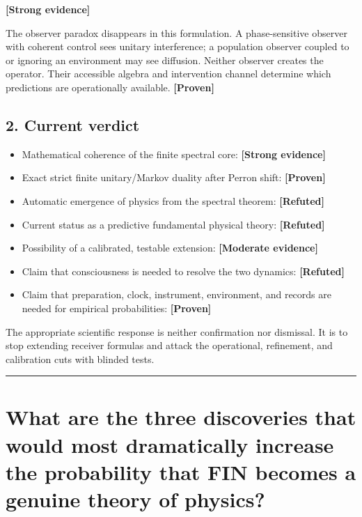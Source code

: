 \documentclass[11pt,a4paper,openany]{report}
\newcommand{\statusProven}{\textcolor{fingreen}{[Proven]}}
\newcommand{\statusStrong}{\textcolor{finblue}{[Strong evidence]}}
\newcommand{\statusModerate}{\textcolor{finviolet}{[Moderate evidence]}}
\newcommand{\statusRefuted}{\textcolor{finred}{[Refuted]}}
\begin{document}
\textbf{\statusStrong{}}

The observer paradox disappears in this formulation. A phase-sensitive observer with coherent control sees unitary interference; a population observer coupled to or ignoring an environment may see diffusion. Neither observer creates the operator. Their accessible algebra and intervention channel determine which predictions are operationally available. \textbf{\statusProven{}}

\section{2. Current verdict}

\begin{itemize}
\item 
Mathematical coherence of the finite spectral core: \textbf{\statusStrong{}}

\item 
Exact strict finite unitary/\allowbreak{}Markov duality after Perron shift: \textbf{\statusProven{}}

\item 
Automatic emergence of physics from the spectral theorem: \textbf{\statusRefuted{}}

\item 
Current status as a predictive fundamental physical theory: \textbf{\statusRefuted{}}

\item 
Possibility of a calibrated, testable extension: \textbf{\statusModerate{}}

\item 
Claim that consciousness is needed to resolve the two dynamics: \textbf{\statusRefuted{}}

\item 
Claim that preparation, clock, instrument, environment, and records are needed for empirical probabilities: \textbf{\statusProven{}}

\end{itemize}

The appropriate scientific response is neither confirmation nor dismissal. It is to stop extending receiver formulas and attack the operational, refinement, and calibration cuts with blinded tests.

\par\medskip\hrule\medskip

\chapter{What are the three discoveries that would most dramatically increase the probability that FIN becomes a genuine theory of physics?}
\end{document}
